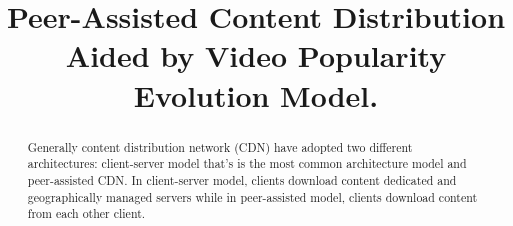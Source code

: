 \documentclass[conference]{IEEEtran}
\begin{document}
%
\title{Peer-Assisted Content Distribution Aided by Video Popularity Evolution Model.}

\author{
 \quad
{}
}








\maketitle


\begin{abstract}
Generally content distribution network (CDN) have adopted two different architectures: client-server model that's is the most common architecture model and peer-assisted CDN.  
In client-server model, clients download content dedicated and geographically managed servers while in peer-assisted model, clients download content from each other client.
\end{abstract}





%
\end{document}
